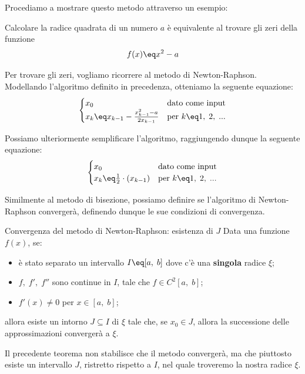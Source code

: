 \nwl
Procediamo a mostrare questo metodo attraverso un esempio:

\begin{example}
    Calcolare la radice quadrata di un numero $a$ è equivalente al trovare gli zeri della funzione
    \[ f(x) \eq x^2 - a \]

    Per trovare gli zeri, vogliamo ricorrere al metodo di Newton-Raphson. Modellando l'algoritmo definito in precedenza, otteniamo la seguente equazione:
    \[ \begin{cases}
        x_0 & \text{dato come input} \\
        x_k \eq x_{k - 1} - \frac{x^2_{k - 1} - a}{2x_{k - 1}} & \text{per } k \eq 1, \; 2, \; ...
    \end{cases} \]

    Possiamo ulteriormente semplificare l'algoritmo, raggiungendo dunque la seguente equazione:
    \[ \begin{cases}
        x_0 & \text{dato come input} \\
        x_k \eq \frac{1}{2} \cdot \left( x_{k - 1} \right) & \text{per } k \eq 1, \; 2, \; ...
    \end{cases} \]
\end{example}

Similmente al metodo di bisezione, possiamo definire se l'algoritmo di Newton-Raphson convergerà, definendo dunque le sue condizioni di convergenza.

\begin{theorem}{Convergenza del metodo di Newton-Raphson: esistenza di $J$}
    Data una funzione $f(x)$, se:
    \begin{itemize}
        \item è stato separato un intervallo $I \eq [a, \; b]$ dove c'è una \textbf{singola} radice $\xi$;
        \item $f, \; f', \; f''$ sono continue in $I$, tale che $f \in C^2 [a, \; b]$;
        \item $f'(x) \neq 0$ per $x \in [a, \; b]$;
    \end{itemize}

    allora esiste un intorno $J \subseteq I$ di $\xi$ tale che, se $x_0 \in J$, allora la successione delle approssimazioni convergerà a $\xi$.

    \begin{center}
    \end{center}
\end{theorem}

Il precedente teorema non stabilisce che il metodo convergerà, ma che piuttosto esiste un intervallo $J$, ristretto rispetto a $I$, nel quale troveremo la nostra radice $\xi$.

